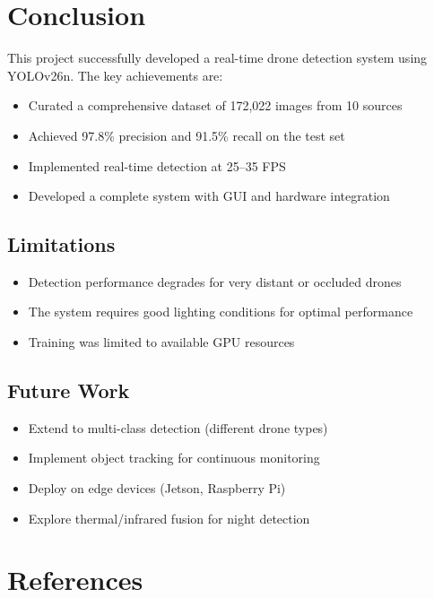 \documentclass[a4paper,12pt]{report}
\begin{document}
\newpage

\chapter{Conclusion}

This project successfully developed a real-time drone detection system using YOLOv26n. The key achievements are:

\begin{itemize}
    \item Curated a comprehensive dataset of 172,022 images from 10 sources
    \item Achieved 97.8\% precision and 91.5\% recall on the test set
    \item Implemented real-time detection at 25--35 FPS
    \item Developed a complete system with GUI and hardware integration
\end{itemize}

\section{Limitations}
\begin{itemize}
    \item Detection performance degrades for very distant or occluded drones
    \item The system requires good lighting conditions for optimal performance
    \item Training was limited to available GPU resources
\end{itemize}

\section{Future Work}
\begin{itemize}
    \item Extend to multi-class detection (different drone types)
    \item Implement object tracking for continuous monitoring
    \item Deploy on edge devices (Jetson, Raspberry Pi)
    \item Explore thermal/infrared fusion for night detection
\end{itemize}

\newpage

\chapter{References}
\end{document}
